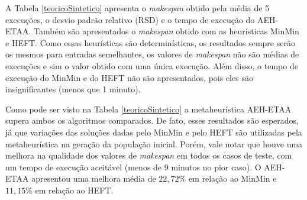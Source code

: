 
A Tabela \ref{teoricoSintetico} apresenta o \textit{makespan} obtido pela média de 5 execuções, o desvio padrão relativo (RSD) e o tempo de execução do AEH-ETAA. Também são apresentados o \textit{makespan} obtido com as heurísticas MinMin e HEFT. Como essas heurísticas são determinísticas, os resultados sempre serão os mesmos para entradas semelhantes, os valores de \textit{makespan} não são médias de execuções e sim o valor obtido com uma única execução. Além disso, o tempo de execução do MinMin e do HEFT não são apresentados, pois eles são insignificantes (menos que 1 minuto).


Como pode ser visto na Tabela \ref{teoricoSintetico} a metaheurística AEH-ETAA supera ambos os algoritmos comparados. De fato, esses resultados são esperados, já que variações das soluções dadas pelo MinMin e pelo HEFT são utilizadas pela metaheurística na geração da população inicial. Porém, vale notar que houve uma melhora na qualidade dos valores de \textit{makespan} em todos os casos de teste, com um tempo de execução aceitável (menos de 9 minutos no pior caso). O AEH-ETAA apresentou uma melhora média de $22,72\%$ em relação ao MinMin e $11,15\%$ em relação ao HEFT.



